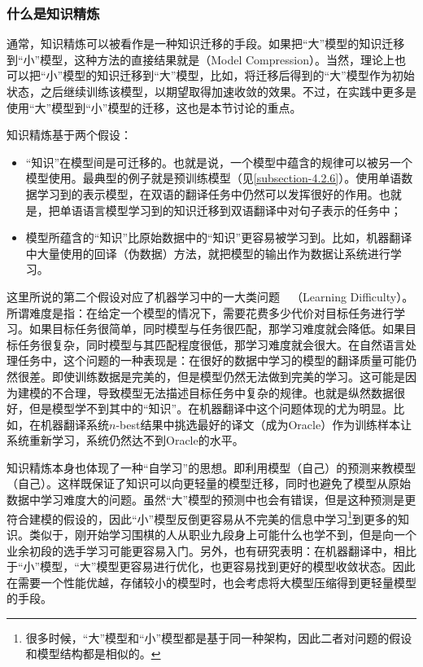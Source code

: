 \subsubsection{什么是知识精炼}

\parinterval 通常，知识精炼可以被看作是一种知识迁移的手段\cite{Hinton2015Distilling}。如果把``大''模型的知识迁移到``小''模型，这种方法的直接结果就是{\small{}}（Model Compression）。当然，理论上也可以把``小''模型的知识迁移到``大''模型，比如，将迁移后得到的``大''模型作为初始状态，之后继续训练该模型，以期望取得加速收敛的效果。不过，在实践中更多是使用``大''模型到``小''模型的迁移，这也是本节讨论的重点。

\parinterval 知识精炼基于两个假设：

\begin{itemize}
\vspace{0.5em}
\item ``知识''在模型间是可迁移的。也就是说，一个模型中蕴含的规律可以被另一个模型使用。最典型的例子就是预训练模型（见\ref{subsection-4.2.6}）。使用单语数据学习到的表示模型，在双语的翻译任务中仍然可以发挥很好的作用。也就是，把单语语言模型学习到的知识迁移到双语翻译中对句子表示的任务中；
\vspace{0.5em}
\item 模型所蕴含的``知识''比原始数据中的``知识''更容易被学习到。比如，机器翻译中大量使用的回译（伪数据）方法，就把模型的输出作为数据让系统进行学习。
\vspace{0.5em}
\end{itemize}

\parinterval 这里所说的第二个假设对应了机器学习中的一大类问题\ \dash \ {\small{}}（Learning Difficulty）。所谓难度是指：在给定一个模型的情况下，需要花费多少代价对目标任务进行学习。如果目标任务很简单，同时模型与任务很匹配，那学习难度就会降低。如果目标任务很复杂，同时模型与其匹配程度很低，那学习难度就会很大。在自然语言处理任务中，这个问题的一种表现是：在很好的数据中学习的模型的翻译质量可能仍然很差。即使训练数据是完美的，但是模型仍然无法做到完美的学习。这可能是因为建模的不合理，导致模型无法描述目标任务中复杂的规律。也就是纵然数据很好，但是模型学不到其中的``知识''。在机器翻译中这个问题体现的尤为明显。比如，在机器翻译系统$n$-best结果中挑选最好的译文（成为Oracle）作为训练样本让系统重新学习，系统仍然达不到Oracle的水平。

\parinterval 知识精炼本身也体现了一种``自学习''的思想。即利用模型（自己）的预测来教模型（自己）。这样既保证了知识可以向更轻量的模型迁移，同时也避免了模型从原始数据中学习难度大的问题。虽然``大''模型的预测中也会有错误，但是这种预测是更符合建模的假设的，因此``小''模型反倒更容易从不完美的信息中学习\footnote[15]{很多时候，``大''模型和``小''模型都是基于同一种架构，因此二者对问题的假设和模型结构都是相似的。}到更多的知识。类似于，刚开始学习围棋的人从职业九段身上可能什么也学不到，但是向一个业余初段的选手学习可能更容易入门。另外，也有研究表明：在机器翻译中，相比于``小''模型，``大''模型更容易进行优化，也更容易找到更好的模型收敛状态。因此在需要一个性能优越，存储较小的模型时，也会考虑将大模型压缩得到更轻量模型的手段\cite{DBLP:journals/corr/abs-2002-11794}。

